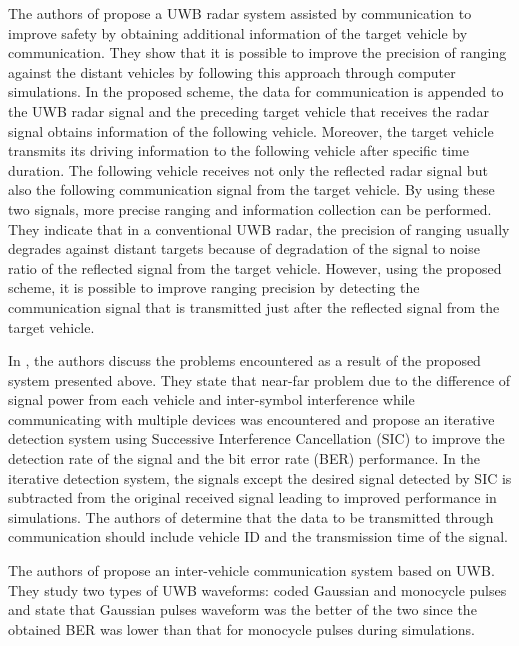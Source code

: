 The authors of \cite{takahara2012study} propose a UWB radar system assisted by communication to improve safety by obtaining additional information of the target vehicle by communication. They show that it is possible to improve the precision of ranging against the distant vehicles by following this approach through computer simulations. In the proposed scheme, the data for communication is appended to the UWB radar signal and the preceding target vehicle that receives the radar signal obtains information of the following vehicle. Moreover, the target vehicle transmits its driving information to the following vehicle after specific time duration. The following vehicle receives not only the reflected radar signal but also the following communication signal from the target vehicle. By using these two signals, more precise ranging and information collection can be performed. They indicate that in a conventional UWB radar, the precision of ranging usually degrades against distant targets because of degradation of the signal to noise ratio of the reflected signal from the target vehicle. However, using the proposed scheme, it is possible to improve ranging precision by detecting the communication signal that is transmitted just after the reflected signal from the target vehicle. 

In \cite{takahara2013study}, the authors discuss the problems encountered as a result of the proposed system presented above. They state that near-far problem due to the difference of signal power from each vehicle and inter-symbol interference while communicating with multiple devices was encountered and propose an iterative detection system using Successive Interference Cancellation (SIC) to improve the detection rate of the signal and the bit error rate (BER) performance. In the iterative detection system, the signals except the desired signal detected by SIC is subtracted from the original received signal leading to improved performance in simulations. The authors of \cite{takahara2014study} determine that the data to be transmitted through communication should include vehicle ID and the transmission time of the signal.

The authors of \cite{elbahhar2005using} propose an inter-vehicle communication system based on UWB. They study two types of UWB waveforms: coded Gaussian and monocycle pulses and state that Gaussian pulses waveform was the better of the two since the obtained BER was lower than that for monocycle pulses during simulations.

